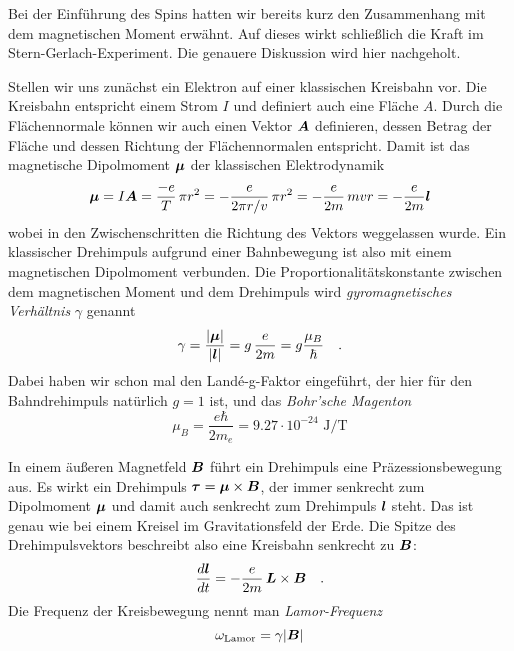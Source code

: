 Bei der Einführung des Spins hatten wir bereits kurz den Zusammenhang mit dem magnetischen Moment erwähnt. Auf dieses wirkt schließlich die Kraft im Stern-Gerlach-Experiment. Die genauere Diskussion wird hier nachgeholt.

Stellen wir uns zunächst ein Elektron auf einer klassischen Kreisbahn vor. Die Kreisbahn entspricht einem Strom $I$ und definiert auch eine Fläche $A$. Durch die Flächennormale können wir auch einen Vektor $\boldsymbol{A}$ definieren, dessen Betrag der Fläche und dessen Richtung der Flächennormalen entspricht. Damit ist das magnetische Dipolmoment $\boldsymbol{\mu}$ der klassischen Elektrodynamik 
\begin{equation}
    \boldsymbol{\mu} = I \boldsymbol{A} = \frac{-e}{T} \, \pi r^2 = - \frac{e}{2\pi r/v} \, \pi r^2 
= -\frac{e}{2m} \, m v r = - \frac{e}{2m} \boldsymbol{l}
\end{equation}
wobei in den Zwischenschritten die Richtung des Vektors weggelassen wurde. Ein klassischer Drehimpuls aufgrund einer Bahnbewegung ist also mit einem magnetischen Dipolmoment verbunden. Die Proportionalitätskonstante zwischen dem magnetischen Moment und dem Drehimpuls wird \emph{gyromagnetisches Verhältnis} $\gamma$ genannt
\begin{equation}
    \gamma  = \frac{|\boldsymbol{\mu}|}{|\boldsymbol{l}|} = g \, \frac{e}{2m} = g \frac{\mu_B}{\hbar} \quad .
\end{equation}
Dabei haben wir schon mal den Landé-g-Faktor eingeführt, der hier für den Bahndrehimpuls natürlich $g=1$ ist, und das \emph{Bohr'sche Magenton} 
\begin{equation}
\mu_B = \frac{e \hbar}{2 m_e} = 9.27 \cdot 10^{-24} \text{ J/T}    
\end{equation}



In einem äußeren Magnetfeld $\boldsymbol{B}$ führt ein Drehimpuls eine Präzessionsbewegung aus. Es wirkt ein Drehimpuls $\boldsymbol{\tau} = \boldsymbol{\mu} \times \boldsymbol{B}$, der immer senkrecht zum Dipolmoment $\boldsymbol{\mu}$ und damit auch senkrecht zum Drehimpuls $\boldsymbol{l}$ steht. Das ist genau wie bei einem Kreisel im Gravitationsfeld der Erde. Die Spitze des Drehimpulsvektors beschreibt also eine Kreisbahn senkrecht zu $\boldsymbol{B}$:
\begin{equation}
    \frac{d \boldsymbol{l}}{dt} = - \frac{e}{2m} \, \boldsymbol{L} \times \boldsymbol{B}  \quad .
\end{equation}
Die Frequenz der Kreisbewegung nennt man \emph{Lamor-Frequenz}
\begin{equation}
    \omega_\text{Lamor} = \gamma | \boldsymbol{B} |
\end{equation}


